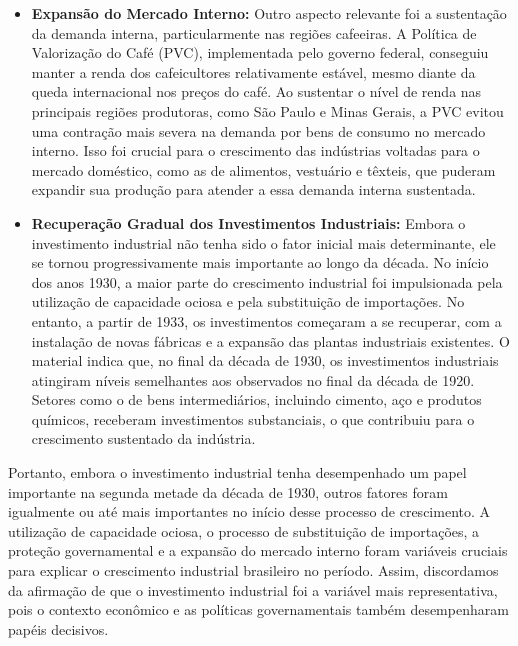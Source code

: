 \documentclass[a4paper,12pt]{article}[abntex2]
\begin{document}
\begin{itemize}
    \item \textbf{Expansão do Mercado Interno:} 
    Outro aspecto relevante foi a sustentação da demanda interna, particularmente nas regiões cafeeiras. A Política de Valorização do Café (PVC), implementada pelo governo federal, conseguiu manter a renda dos cafeicultores relativamente estável, mesmo diante da queda internacional nos preços do café. Ao sustentar o nível de renda nas principais regiões produtoras, como São Paulo e Minas Gerais, a PVC evitou uma contração mais severa na demanda por bens de consumo no mercado interno. Isso foi crucial para o crescimento das indústrias voltadas para o mercado doméstico, como as de alimentos, vestuário e têxteis, que puderam expandir sua produção para atender a essa demanda interna sustentada. 

    \item \textbf{Recuperação Gradual dos Investimentos Industriais:} 
    Embora o investimento industrial não tenha sido o fator inicial mais determinante, ele se tornou progressivamente mais importante ao longo da década. No início dos anos 1930, a maior parte do crescimento industrial foi impulsionada pela utilização de capacidade ociosa e pela substituição de importações. No entanto, a partir de 1933, os investimentos começaram a se recuperar, com a instalação de novas fábricas e a expansão das plantas industriais existentes. O material indica que, no final da década de 1930, os investimentos industriais atingiram níveis semelhantes aos observados no final da década de 1920. Setores como o de bens intermediários, incluindo cimento, aço e produtos químicos, receberam investimentos substanciais, o que contribuiu para o crescimento sustentado da indústria.

\end{itemize}

Portanto, embora o investimento industrial tenha desempenhado um papel importante na segunda metade da década de 1930, outros fatores foram igualmente ou até mais importantes no início desse processo de crescimento. A utilização de capacidade ociosa, o processo de substituição de importações, a proteção governamental e a expansão do mercado interno foram variáveis cruciais para explicar o crescimento industrial brasileiro no período. Assim, discordamos da afirmação de que o investimento industrial foi a variável mais representativa, pois o contexto econômico e as políticas governamentais também desempenharam papéis decisivos.
\end{document}

